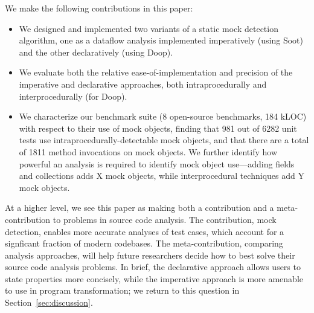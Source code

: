 We make the following contributions in this paper:
\begin{itemize}
\item We designed and implemented two variants of a static mock detection algorithm, one as a dataflow analysis implemented imperatively (using Soot) and the other declaratively (using Doop).
\item We evaluate both the relative ease-of-implementation and precision of the imperative and declarative approaches, both intraprocedurally and interprocedurally (for Doop). %
\item We characterize our benchmark suite (8 open-source benchmarks, 184 kLOC) with respect to their use of mock objects, finding that 981 out of 6282 unit tests use intraprocedurally-detectable mock objects, and that there are a total of 1811 method invocations on mock objects. We further identify how powerful an analysis is required to identify mock object use---adding fields and collections adds X mock objects, while interprocedural techniques add Y mock objects.
\end{itemize}
At a higher level, we see this paper as making both a contribution and a meta-contribution to
problems in source code analysis. The contribution, mock detection, enables more accurate analyses
of test cases, which account for a signficant fraction of modern codebases. The meta-contribution,
comparing analysis approaches, will help future researchers decide how to best solve their
source code analysis problems. In brief, the declarative approach allows users to state properties more
concisely, while the imperative approach is more amenable to use in program transformation; we return
to this question in Section~\ref{sec:discussion}.

